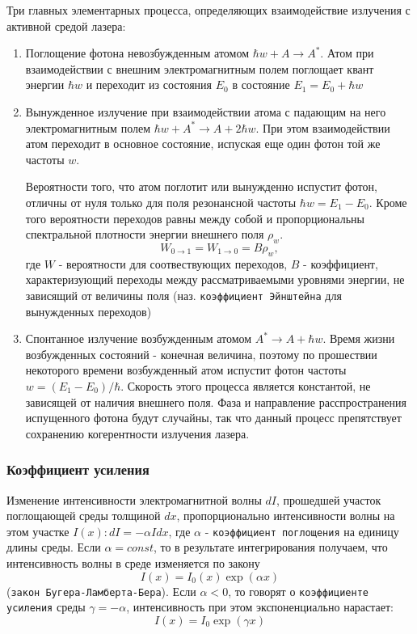 \documentclass[a4paper,12pt]{article}
\begin{document}
Три главных элементарных процесса, определяющих взаимодействие излучения с активной средой лазера:
\begin{enumerate}
    \item Поглощение фотона невозбужденным атомом $\hbar w + A \rightarrow A^*$. Атом при взаимодействии с внешним электромагнитным полем поглощает квант энергии $\hbar w$ и переходит из состояния $E_0$ в состояние $E_1=E_0+\hbar w$
    \item Вынужденное излучение при взаимодействии атома с падающим на него электромагнитным полем $\hbar w + A^* \rightarrow A+2\hbar w$. При этом взаимодействии атом переходит в основное состояние, испуская еще один фотон той же частоты $w$.

    Вероятности того, что атом поглотит или вынужденно испустит фотон, отличны от нуля только для поля резонансной частоты $\hbar w = E_1-E_0$. Кроме того вероятности переходов равны между собой и пропорциональны спектральной плотности энергии внешнего поля $\rho_w$.
    \begin{equation}
        W_{0\rightarrow 1} = W_{1\rightarrow 0} = B\rho_w,
    \end{equation}
    где $W$ - вероятности для соотвествующих переходов, $B$ - коэффициент, характеризующий переходы между рассматриваемыми уровнями энергии, не зависящий от величины поля (наз. \texttt{коэффициент Эйнштейна} для вынужденных переходов)
    \item Спонтанное излучение возбужденным атомом $A^* \rightarrow A +\hbar w$. Время жизни возбужденных состояний - конечная величина, поэтому по прошествии некоторого времени возбужденный атом испустит фотон частоты $w=(E_1-E_0)/\hbar$. Скорость этого процесса является константой, не зависящей от наличия внешнего поля. Фаза и направление расспространения испущенного фотона будут случайны, так что данный процесс препятствует сохранению когерентности излучения лазера.
\end{enumerate}

\subsubsection{Коэффициент усиления}

Изменение интенсивности электромагнитной волны $dI$, прошедшей участок поглощающей среды толщиной $dx$, пропорционально интенсивности волны на этом участке $I(x): dI=-\alpha Idx$, где $\alpha$ - \texttt{коэффициент поглощения} на единицу длины среды. Если $\alpha=const$, то в результате интегрирования получаем, что интенсивность волны в среде изменяется по закону
$$
I(x) = I_0(x)\exp(\alpha x)
$$
(\texttt{закон Бугера-Ламберта-Бера}). Если $\alpha <0$, то говорят о \texttt{коэффициенте усиления} среды $\gamma=-\alpha$, интенсивность при этом экспоненциально нарастает:
\begin{equation}
    I(x) = I_0\exp(\gamma x)
\end{equation}
\end{document}
